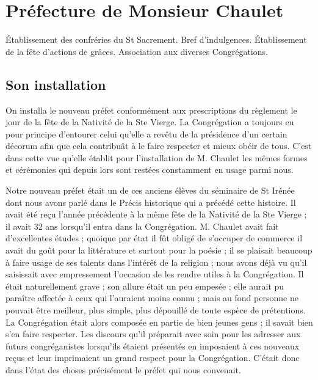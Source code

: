 \chapter{Préfecture de Monsieur Chaulet}
\begin{center}
Établissement des confréries du St Sacrement. Bref d'indulgences. Établissement de la fête d'actions de grâces. Association aux diverses Congrégations.
\end{center}

\section*{Son installation}
On installa le nouveau préfet conformément aux prescriptions du règlement le jour de la fête de la Nativité de la Ste Vierge. La Congrégation a toujours eu pour principe d'entourer celui qu'elle a revêtu de la présidence d'un certain décorum afin que cela contribuât à le faire respecter et mieux obéir de tous. C'est dans cette vue qu'elle établit pour l'installation de M. Chaulet les mêmes formes et cérémonies qui depuis lors sont restées constamment en usage parmi nous.

Notre nouveau préfet était un de ces anciens élèves du séminaire de St Irénée dont nous avons parlé dans le Précis historique qui a précédé cette histoire. Il avait été reçu l'année précédente à la même fête de la Nativité de la Ste Vierge ; il avait 32 ans lorsqu'il entra dans la Congrégation. M. Chaulet avait fait d'excellentes études ; quoique par état il fût obligé de s'occuper de commerce il avait du goût pour la littérature et surtout pour la poésie ; il se plaisait beaucoup à faire usage de ses talents dans l'intérêt de la religion ; nous avons déjà vu qu'il saisissait avec empressement l'occasion de les rendre utiles à la Congrégation. Il était naturellement grave ; son allure était un peu empesée ;
elle aurait pu paraître affectée à ceux qui l'auraient moins connu ; mais au fond personne ne pouvait être meilleur, plus simple, plus dépouillé de toute espèce de prétentions. La Congrégation était alors composée en partie de bien jeunes gens ; il savait bien s'en faire respecter. Les discours qu'il préparait avec soin pour les adresser aux futurs congréganistes lorsqu'ils étaient présentés en imposaient à ces nouveaux reçus et leur imprimaient un grand respect pour la Congrégation. C'était donc dans l'état des choses précisément le préfet qui nous convenait.

